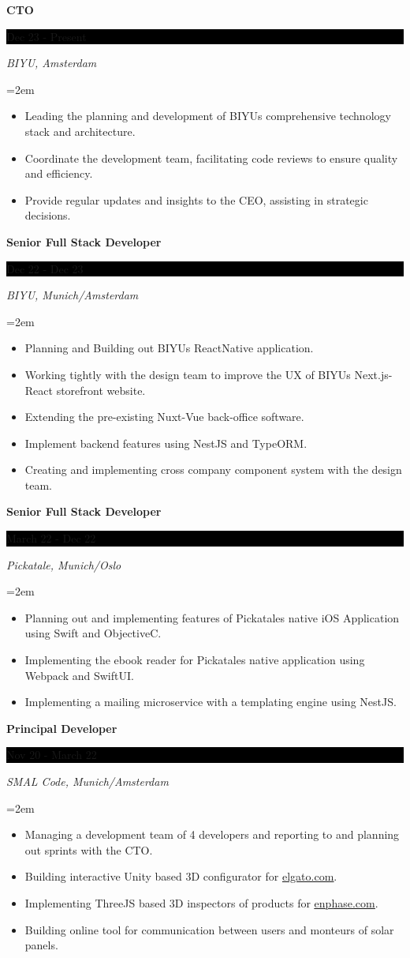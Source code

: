 \documentclass[fontsize=11pt]{article}
\newcommand{\link}[1]{{\color{blue}\underline{\href{#1}{#1}}}}
\newcommand{\sepspace}{\vspace*{1em}}   %
\newcommand{\EducationEntry}[4]{
    \noindent \textbf{#1} \hfill      %
    \colorbox{Black}{
      \parbox{8.5em}{
      \hfill\color{White}#2}} \par  %
    \noindent \textit{#3} \par        %
    \noindent\hangindent=2em\hangafter=0 \small #4 %
    \normalsize \par}
\newcommand{\WorkEntry}[4]{       %
    \noindent \textbf{#1} \hfill      %
    \colorbox{Black}{%
      \parbox{9em}{%
      \hfill\color{White}#2}} \par   %
        \noindent \textit{#3} \par        %
    \noindent\hangindent=2em\hangafter=0 \small #4 %
    \normalsize \par}
\begin{document}
\WorkEntry
{CTO}
{Dec 23 - Present}
{BIYU, Amsterdam}
{\begin{itemize} \itemsep -1pt
	\item Leading the planning and development of BIYU\textquotesingle{}s comprehensive technology stack and architecture.
	\item Coordinate the development team, facilitating code reviews to ensure quality and efficiency.
	\item Provide regular updates and insights to the CEO, assisting in strategic decisions.
	\end{itemize}}
\sepspace
\WorkEntry
{Senior Full Stack Developer}
{Dec 22 - Dec 23}
{BIYU, Munich/Amsterdam}
{\begin{itemize} \itemsep -1pt
	\item Planning and Building out BIYUs ReactNative application.
	\item Working tightly with the design team to improve the UX of BIYU\textquotesingle{}s Next.js-React storefront website.
	\item Extending the pre-existing Nuxt-Vue back-office software.
	\item Implement backend features using NestJS and TypeORM.
	\item Creating and implementing cross company component system with the design team.
	\end{itemize}}
\sepspace
\WorkEntry
{Senior Full Stack Developer}
{March 22 - Dec 22}
{Pickatale, Munich/Oslo}
{\begin{itemize} \itemsep -1pt
	\item Planning out and implementing features of Pickatale\textquotesingle{}s native iOS Application using Swift and ObjectiveC.
	\item Implementing the ebook reader for Pickatale\textquotesingle{}s native application using Webpack and SwiftUI.
	\item Implementing a mailing microservice with a templating engine using NestJS.
	\end{itemize}}
\sepspace
\WorkEntry
{Principal Developer}
{Nov 20 - March 22}
{SMAL Code, Munich/Amsterdam}
{\begin{itemize} \itemsep -1pt
	\item Managing a development team of 4 developers and reporting to and planning out sprints with the CTO.
	\item Building interactive Unity based 3D configurator for \link{elgato.com}.
	\item Implementing ThreeJS based 3D inspectors of products for \link{enphase.com}.
	\item Building online tool for communication between users and monteurs of solar panels.
	\end{itemize}}
\end{document}
